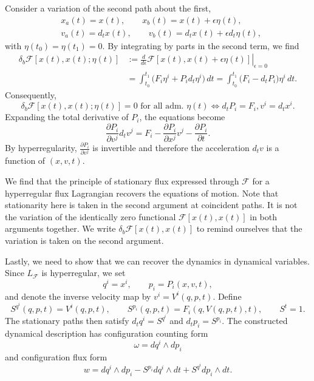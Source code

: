 \documentclass[12pt]{article}
\begin{document}
Consider a variation of the second path about the first,
\begin{equation}
	\begin{aligned}
	&x_a(t)=x(t),
	\qquad
	x_b(t)=x(t)+\epsilon\eta(t), \\
	&v_a(t)=d_tx(t),
	\qquad
	v_b(t)=d_tx(t)+\epsilon d_t\eta(t),
	\end{aligned}
\end{equation}
with $\eta(t_0)=\eta(t_1)=0$. By integrating by parts in the second term, we find
\begin{equation}
	\begin{aligned}
		\delta_b\mathcal{F}[x(t),x(t);\eta(t)]
		&:=
		\left.
		\frac{d}{d\epsilon}
		\mathcal{F}[x(t),x(t)+\epsilon\eta(t)]
		\right|_{\epsilon=0}\\
		&=
		\int_{t_0}^{t_1}
		\bigl(F_i\eta^i+P_i d_t\eta^i\bigr)\,dt
		=
		\int_{t_0}^{t_1}
		\bigl(F_i-d_tP_i\bigr)\eta^i\,dt.
	\end{aligned}
\end{equation}
Consequently,
\begin{equation}\label{eq:fluxLagrangianStationarity}
	\delta_b\mathcal{F}[x(t),x(t);\eta(t)]=0
	\text{ for all adm. }\eta(t)
	\iff
	d_tP_i=F_i,
	 v^i=d_tx^i.
\end{equation}
Expanding the total derivative of $P_i$, the equations become
\begin{equation}
	\frac{\partial P_i}{\partial v^j}d_tv^j
	=
	F_i
	-
	\frac{\partial P_i}{\partial x^j}v^j
	-
	\frac{\partial P_i}{\partial t}.
\end{equation}
By hyperregularity, $\frac{\partial P_i}{\partial v^j}$ is invertible and therefore the acceleration $d_t v$ is a function of $(x,v,t)$.

We find that the principle of stationary flux expressed through $\mathcal{F}$ for a hyperregular flux Lagrangian recovers the equations of motion. Note that stationarity here is taken in the second argument at coincident paths. It is not the variation of the identically zero functional $\mathcal{F}[x(t),x(t)]$ in both arguments together. We write $\delta_b \mathcal{F}[x(t),x(t)]$ to remind ourselves that the variation is taken on the second argument.

Lastly, we need to show that we can recover the dynamics in dynamical variables. Since $L_{\mathcal{F}}$ is hyperregular, we set
\begin{equation}
	q^i=x^i,
	\qquad
	p_i=P_i(x,v,t),
\end{equation}
and denote the inverse velocity map by $v^i=V^i(q,p,t)$. Define
\begin{equation}
	S^{q^i}(q,p,t)=V^i(q,p,t),
	\qquad
	S^{p_i}(q,p,t)=F_i(q,V(q,p,t),t),
	\qquad
	S^t=1.
\end{equation}
The stationary paths then satisfy $d_tq^i=S^{q^i}$ and $d_tp_i=S^{p_i}$. The constructed dynamical description has configuration counting form
\begin{equation}
	\omega=dq^i\wedge dp_i
\end{equation}
and configuration flux form
\begin{equation}
	w
	=
	dq^i\wedge dp_i
	-S^{p_i}dq^i\wedge dt
	+S^{q^i}dp_i\wedge dt.
\end{equation}
\end{document}
